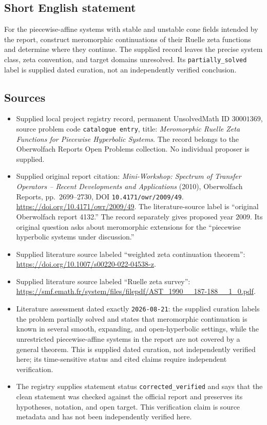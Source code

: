 \documentclass[11pt]{article}
\begin{document}
\subsection{Short English statement}
For the piecewise-affine systems with stable and unstable cone fields intended by the report, construct meromorphic continuations of their Ruelle zeta functions and determine where they continue. The supplied record leaves the precise system class, zeta convention, and target domains unresolved. Its \texttt{partially\_solved} label is supplied dated curation, not an independently verified conclusion.
\subsection{Sources}
\begin{itemize}
\item Supplied local project registry record, permanent UnsolvedMath ID \(30001369\), source problem code \texttt{catalogue entry}, title: \emph{Meromorphic Ruelle Zeta Functions for Piecewise Hyperbolic Systems}. The record belongs to the Oberwolfach Reports Open Problems collection. No individual proposer is supplied.
\item Supplied original report citation: \emph{Mini-Workshop: Spectrum of Transfer Operators -- Recent Developments and Applications} (2010), Oberwolfach Reports, pp.~2699--2730, DOI \texttt{10.4171/owr/2009/49}. \url{https://doi.org/10.4171/owr/2009/49}. The literature-source label is ``original Oberwolfach report 4132.'' The record separately gives proposed year \(2009\). Its original question asks about meromorphic extensions for the ``piecewise hyperbolic systems under discussion.''
\item Supplied literature source labeled ``weighted zeta continuation theorem'': \url{https://doi.org/10.1007/s00220-022-04538-z}.
\item Supplied literature source labeled ``Ruelle zeta survey'': \url{https://smf.emath.fr/system/files/filepdf/AST_1990__187-188__1_0.pdf}.
\item Literature assessment dated exactly \texttt{2026-08-21}: the supplied curation labels the problem partially solved and states that meromorphic continuation is known in several smooth, expanding, and open-hyperbolic settings, while the unrestricted piecewise-affine systems in the report are not covered by a general theorem. This is supplied dated curation, not independently verified here; its time-sensitive status and cited claims require independent verification.
\item The registry supplies statement status \texttt{corrected\_verified} and says that the clean statement was checked against the official report and preserves its hypotheses, notation, and open target. This verification claim is source metadata and has not been independently verified here.
\end{itemize}
\end{document}
